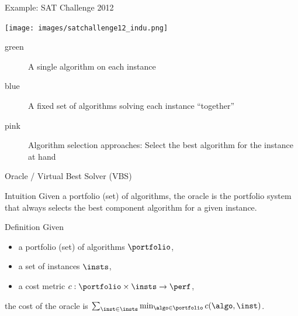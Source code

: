 \begin{frame}[c]{Example: SAT Challenge 2012}

\centering
\texttt{[image: images/satchallenge12\_indu.png]}

\begin{description}
  \item[green] A single algorithm on each instance
  \item[blue] A fixed set of algorithms solving each instance ``together''
  \item[pink] Algorithm selection approaches: Select the best algorithm for the instance at hand 
\end{description}

\end{frame}
\begin{frame}[c]{Oracle / Virtual Best Solver (VBS)}

\begin{block}{Intuition}
Given a portfolio (set) of algorithms, the oracle is the portfolio system
that always selects the best component algorithm for a given instance.
\end{block}

\pause
\bigskip

\begin{block}{Definition}
Given 
\begin{itemize}
  \item a portfolio (set) of algorithms $\portfolio$,
  \item a set of instances $\insts$,
  \item a cost metric $c: \portfolio \times \insts \to \perf$, 
\end{itemize} 
the cost of the oracle is $\sum_{\inst \in \insts} \min_{\algo \in \portfolio} c(\algo, \inst)$.
\end{block}


\end{frame}
